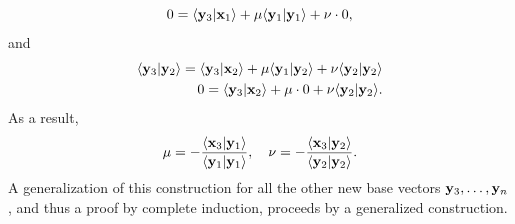 {\begin{equation}
\begin{split}
\\
0
=
\langle {\bf y}_3\vert {\bf x}_1 \rangle + \mu  \langle {\bf y}_1\vert {\bf y}_1 \rangle  + \nu  \cdot 0 ,
\end{split}
\end{equation}
and
\begin{equation}
\begin{split}
\langle {\bf y}_3\vert {\bf y}_2\rangle =\langle {\bf y}_3\vert {\bf x}_2 \rangle + \mu  \langle {\bf y}_1\vert {\bf y}_2 \rangle  + \nu  \langle {\bf y}_2\vert {\bf y}_2\rangle
\\
0 =\langle {\bf y}_3\vert {\bf x}_2 \rangle + \mu   \cdot 0  + \nu  \langle {\bf y}_2\vert {\bf y}_2 \rangle  .
\end{split}
\end{equation}
As a result,
\begin{equation}
\mu = -  \frac{\langle {\bf x}_3\vert {\bf y}_1  \rangle}
{\langle {\bf y}_1\vert {\bf y}_1 \rangle},\quad
\nu =- \frac{\langle {\bf x}_3\vert {\bf y}_2  \rangle}
{\langle {\bf y}_2\vert {\bf y}_2 \rangle}.
\end{equation}
A generalization of this construction
for all the other new base vectors
${\bf y}_3, \ldots ,  {\bf y}_n$, and thus a proof by complete induction,
proceeds by a generalized construction.
\eproof
}

